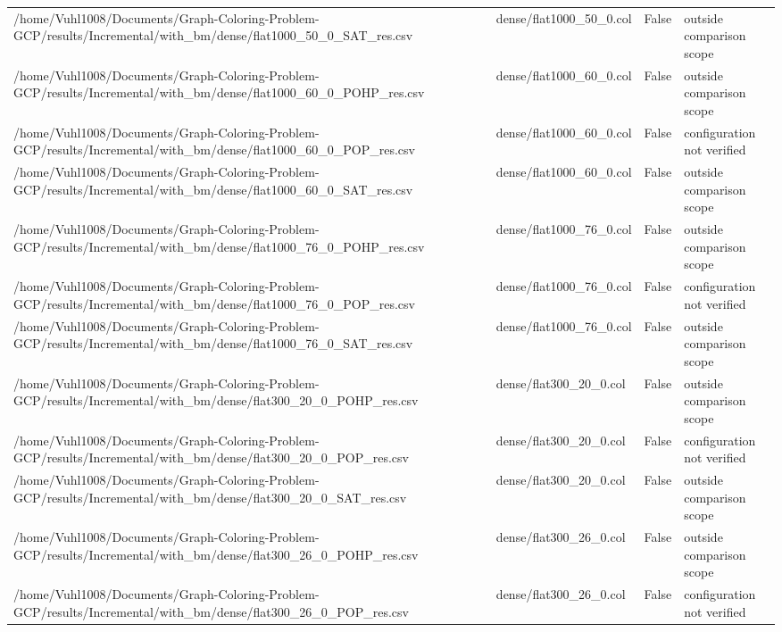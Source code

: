 \begin{table}[htbp]
\begin{tabular}{llll}
/home/Vuhl1008/Documents/Graph-Coloring-Problem-GCP/results/Incremental/with\_bm/dense/flat1000\_50\_0\_SAT\_res.csv & dense/flat1000\_50\_0.col & False & outside comparison scope \\
/home/Vuhl1008/Documents/Graph-Coloring-Problem-GCP/results/Incremental/with\_bm/dense/flat1000\_60\_0\_POHP\_res.csv & dense/flat1000\_60\_0.col & False & outside comparison scope \\
/home/Vuhl1008/Documents/Graph-Coloring-Problem-GCP/results/Incremental/with\_bm/dense/flat1000\_60\_0\_POP\_res.csv & dense/flat1000\_60\_0.col & False & configuration not verified \\
/home/Vuhl1008/Documents/Graph-Coloring-Problem-GCP/results/Incremental/with\_bm/dense/flat1000\_60\_0\_SAT\_res.csv & dense/flat1000\_60\_0.col & False & outside comparison scope \\
/home/Vuhl1008/Documents/Graph-Coloring-Problem-GCP/results/Incremental/with\_bm/dense/flat1000\_76\_0\_POHP\_res.csv & dense/flat1000\_76\_0.col & False & outside comparison scope \\
/home/Vuhl1008/Documents/Graph-Coloring-Problem-GCP/results/Incremental/with\_bm/dense/flat1000\_76\_0\_POP\_res.csv & dense/flat1000\_76\_0.col & False & configuration not verified \\
/home/Vuhl1008/Documents/Graph-Coloring-Problem-GCP/results/Incremental/with\_bm/dense/flat1000\_76\_0\_SAT\_res.csv & dense/flat1000\_76\_0.col & False & outside comparison scope \\
/home/Vuhl1008/Documents/Graph-Coloring-Problem-GCP/results/Incremental/with\_bm/dense/flat300\_20\_0\_POHP\_res.csv & dense/flat300\_20\_0.col & False & outside comparison scope \\
/home/Vuhl1008/Documents/Graph-Coloring-Problem-GCP/results/Incremental/with\_bm/dense/flat300\_20\_0\_POP\_res.csv & dense/flat300\_20\_0.col & False & configuration not verified \\
/home/Vuhl1008/Documents/Graph-Coloring-Problem-GCP/results/Incremental/with\_bm/dense/flat300\_20\_0\_SAT\_res.csv & dense/flat300\_20\_0.col & False & outside comparison scope \\
/home/Vuhl1008/Documents/Graph-Coloring-Problem-GCP/results/Incremental/with\_bm/dense/flat300\_26\_0\_POHP\_res.csv & dense/flat300\_26\_0.col & False & outside comparison scope \\
/home/Vuhl1008/Documents/Graph-Coloring-Problem-GCP/results/Incremental/with\_bm/dense/flat300\_26\_0\_POP\_res.csv & dense/flat300\_26\_0.col & False & configuration not verified \\

\end{tabular}
\end{table}

